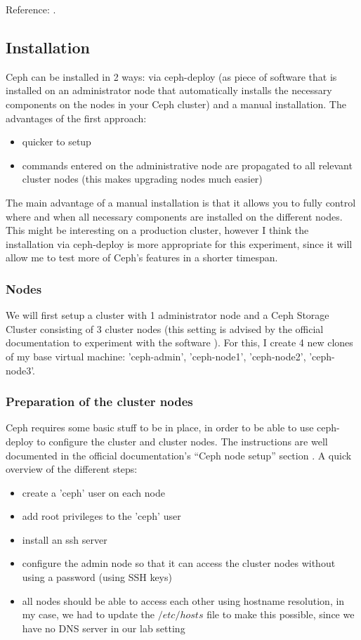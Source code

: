 \documentclass[12pt]{report}
\begin{document}
Reference: \cite{ceph_developerworks}.

\subsection{Installation}
Ceph can be installed in 2 ways: via ceph-deploy (as piece of software
that is installed on an administrator node that automatically installs the
necessary components on the nodes in your Ceph cluster) and a
manual installation.
The advantages of the first approach:
\begin{itemize}
\item quicker to setup
\item commands entered on the administrative node are 
  propagated to all relevant cluster nodes (this makes upgrading nodes
  much easier)
\end{itemize}
The main advantage of a manual installation is that it allows you to
fully control where and when all necessary components are installed on the different
nodes. 
This might be interesting on a production cluster, however I think the
installation via ceph-deploy is more appropriate for this experiment, since it will
allow me to test more of Ceph's features in a shorter timespan.

\subsubsection{Nodes}
We will first setup a cluster with 1 administrator node and a Ceph
Storage Cluster consisting of 3 cluster nodes (this setting is advised
by the official documentation to experiment with the software \cite{ceph_official_doc}).
For this, I create 4 new clones of my base virtual machine:
'ceph-admin', 'ceph-node1', 'ceph-node2', 'ceph-node3'.

\subsubsection{Preparation of the cluster nodes}
Ceph requires some basic stuff to be in place, in order to be able to
use ceph-deploy to configure the cluster and cluster nodes.
The instructions are well documented in the official documentation's
``Ceph node setup'' section \cite{ceph_official_doc}.
A quick overview of the different steps:
\begin{itemize}
\item create a 'ceph' user on each node
\item add root privileges to the 'ceph' user
\item install an ssh server
\item configure the admin node so that it can access the cluster nodes
  without using a password (using SSH keys)
\item all nodes should be able to access each other using hostname
  resolution, in my case, we had to update the $/etc/hosts$ file to
  make this possible, since we have no DNS server in our lab setting
\end{itemize}
\end{document}
